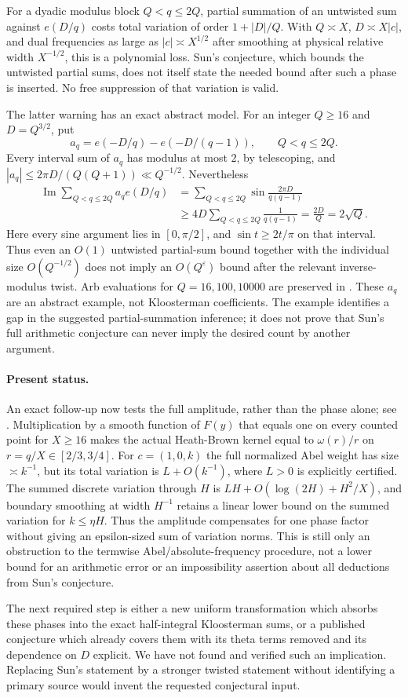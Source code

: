For a dyadic modulus block $Q<q\leq2Q$, partial summation of an
untwisted sum against $e(D/q)$ costs total variation of order
$1+|D|/Q$.  With $Q\asymp X$, $D\asymp X|c|$, and dual
frequencies as large as $|c|\asymp X^{1/2}$ after smoothing at
physical relative width $X^{-1/2}$, this is a polynomial loss.
Sun's conjecture, which bounds the untwisted partial sums, does
not itself state the needed bound after such a phase is inserted.
No free suppression of that variation is valid.

The latter warning has an exact abstract model.  For an integer
$Q\geq16$ and $D=Q^{3/2}$, put
\[
 a_q=e(-D/q)-e(-D/(q-1)),\qquad Q<q\leq2Q.
\]
Every interval sum of $a_q$ has modulus at most $2$, by telescoping,
and $|a_q|\leq2\pi D/(Q(Q+1))\ll Q^{-1/2}$.
Nevertheless
\begin{align*}
 \operatorname{Im}\sum_{Q<q\leq2Q}a_q e(D/q)
 &=\sum_{Q<q\leq2Q}\sin\frac{2\pi D}{q(q-1)}\\
 &\geq4D\sum_{Q<q\leq2Q}\frac1{q(q-1)}
 =\frac{2D}{Q}=2\sqrt Q.
\end{align*}
Here every sine argument lies in $[0,\pi/2]$, and
$\sin t\geq2t/\pi$ on that interval.
Thus even an $O(1)$ untwisted partial-sum bound together with the
individual size $O(Q^{-1/2})$ does not imply an
$O(Q^\varepsilon)$ bound after the relevant inverse-modulus twist.
Arb evaluations for $Q=16,100,10000$ are preserved in
.
These $a_q$ are an abstract example, not Kloosterman coefficients.
The example identifies a gap in the suggested partial-summation
inference; it does not prove that Sun's full arithmetic conjecture
can never imply the desired count by another argument.

\paragraph{Present status.}
An exact follow-up now tests the full amplitude, rather than the phase
alone; see .  Multiplication
by a smooth function of $F(y)$ that equals one on every counted point
for $X\geq16$ makes the actual Heath-Brown kernel equal to
$\omega(r)/r$ on $r=q/X\in[2/3,3/4]$.  For $c=(1,0,k)$ the full
normalized Abel weight has size $\asymp k^{-1}$, but its total
variation is $L+O(k^{-1})$, where $L>0$ is explicitly certified.
The summed discrete variation through $H$ is
$LH+O(\log(2H)+H^2/X)$, and boundary smoothing at width $H^{-1}$
retains a linear lower bound on the summed variation for
$k\leq\eta H$.  Thus the amplitude compensates for one phase factor
without giving an epsilon-sized sum of variation norms.  This is
still only an obstruction to the termwise Abel/absolute-frequency
procedure, not a lower bound for an arithmetic error or an
impossibility assertion about all deductions from Sun's conjecture.

The next required step is either a new uniform transformation which
absorbs these phases into the exact half-integral Kloosterman sums,
or a published conjecture which already covers them with its theta
terms removed and its dependence on $D$ explicit.  We have not
found and verified such an implication.  Replacing Sun's statement
by a stronger twisted statement without identifying a primary
source would invent the requested conjectural input.
